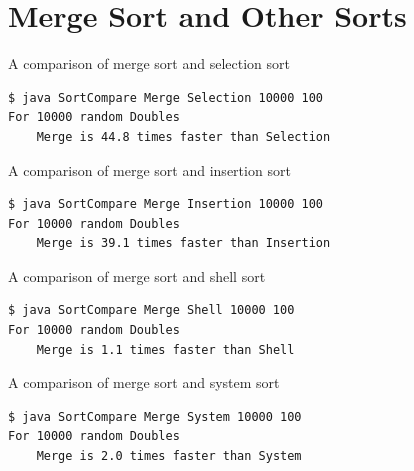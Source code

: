 \documentclass[8pt,a4paper,compress]{beamer}
\begin{document}
\section{Merge Sort and Other Sorts}
\begin{frame}[fragile]
\pause

A comparison of merge sort and selection sort

\begin{lstlisting}[language={}]
$ java SortCompare Merge Selection 10000 100
For 10000 random Doubles
    Merge is 44.8 times faster than Selection
\end{lstlisting}

\pause
\bigskip

A comparison of merge sort and insertion sort
\begin{lstlisting}[language={}]
$ java SortCompare Merge Insertion 10000 100
For 10000 random Doubles
    Merge is 39.1 times faster than Insertion
\end{lstlisting}

\pause
\bigskip

A comparison of merge sort and shell sort

\begin{lstlisting}[language={}]
$ java SortCompare Merge Shell 10000 100
For 10000 random Doubles
    Merge is 1.1 times faster than Shell
\end{lstlisting}

\pause
\bigskip

A comparison of merge sort and system sort

\begin{lstlisting}[language={}]
$ java SortCompare Merge System 10000 100
For 10000 random Doubles
    Merge is 2.0 times faster than System
\end{lstlisting}
\end{frame}
\end{document}

